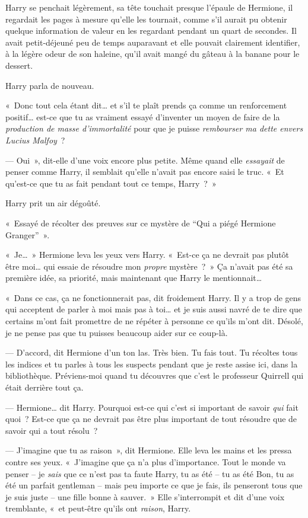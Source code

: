 Harry se penchait légèrement, sa tête touchait presque l'épaule de Hermione, il regardait les pages à mesure qu'elle les tournait, comme s'il aurait pu obtenir quelque information de valeur en les regardant pendant un quart de secondes. Il avait petit-déjeuné peu de temps auparavant et elle pouvait clairement identifier, à la légère odeur de son haleine, qu'il avait mangé du gâteau à la banane pour le dessert.

Harry parla de nouveau.

«~Donc tout cela étant dit… et s'il te plaît prends ça comme un renforcement positif… est-ce que tu as vraiment essayé d'inventer un moyen de faire de la \emph{production de masse d'immortalité} pour que je puisse \emph{rembourser ma dette envers Lucius Malfoy}~?

--- Oui~», dit-elle d'une voix encore plus petite. Même quand elle \emph{essayait} de penser comme Harry, il semblait qu'elle n'avait pas encore saisi le truc. «~Et qu'est-ce que tu as fait pendant tout ce temps, Harry~?~»

Harry prit un air dégoûté.

«~Essayé de récolter des preuves sur ce mystère de “Qui a piégé Hermione Granger”~».

«~Je…~» Hermione leva les yeux vers Harry. «~Est-ce ça ne devrait pas plutôt être moi… qui essaie de résoudre mon \emph{propre} mystère~?~» Ça n'avait pas été sa première idée, sa priorité, mais maintenant que Harry le mentionnait…

«~Dans ce cas, ça ne fonctionnerait pas, dit froidement Harry. Il y a trop de gens qui acceptent de parler à moi mais pas à toi… et je suis aussi navré de te dire que certains m'ont fait promettre de ne répéter à personne ce qu'ils m'ont dit. Désolé, je ne pense pas que tu puisses beaucoup aider sur ce coup-là.

--- D'accord, dit Hermione d'un ton las. Très bien. Tu fais tout. Tu récoltes tous les indices et tu parles à tous les suspects pendant que je reste assise ici, dans la bibliothèque. Préviens-moi quand tu découvres que c'est le professeur Quirrell qui était derrière tout ça.

--- Hermione… dit Harry. Pourquoi est-ce qui c'est si important de savoir \emph{qui} fait quoi~? Est-ce que ça ne devrait pas être plus important de tout résoudre que de savoir qui a tout résolu~?

--- J'imagine que tu as raison~», dit Hermione. Elle leva les mains et les pressa contre ses yeux. «~J'imagine que ça n'a plus d'importance. Tout le monde va penser -- je \emph{sais} que ce n'est pas ta faute Harry, tu as été -- tu as été Bon, tu as été un parfait gentleman -- mais peu importe ce que je fais, ils penseront tous que je suis juste -- une fille bonne à sauver.~» Elle s'interrompit et dit d'une voix tremblante, «~et peut-être qu'ils ont \emph{raison}, Harry.

